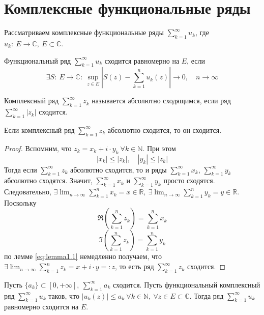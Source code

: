 \documentclass[11pt]{article}
\begin{document}
\section{Комплексные функциональные ряды} \leavevmode
Рассматриваем комплексные функциональные ряды $\displaystyle \sum_{k = 1}^{\infty} u_k$, где $u_k: \ E \to \mathbb{C}, \ E \subset \mathbb{C}$.

\begin{definition}
    Функциональный ряд $\displaystyle \sum_{k = 1}^{\infty} u_k$ сходится равномерно на $E$, если \[\exists S: \ E \to \mathbb{C}: \ \sup_{z \in E} \left|S(z) - 
    \sum_{k = 1}^{n} u_k(z)\right| \to 0, \quad n \to \infty\]
\end{definition}

\begin{definition}
    Комплексный ряд $\displaystyle \sum_{k = 1}^{\infty} z_k$ называется абсолютно сходящимся, если ряд $\displaystyle \sum_{k = 1}^{\infty} |z_k|$ сходится.
\end{definition}

\begin{lemma}
    Если комплексный ряд $\displaystyle \sum_{k = 1}^{\infty} z_k$ абсолютно сходится, то он сходится.
\end{lemma}

\begin{proof}
    Вспомним, что $z_k = x_k + i \cdot y_k \ \forall k \in \mathbb{N}$. При этом \[|x_k| \leq |z_k|, \quad |y_k| \leq |z_k|\] Тогда если $\displaystyle \sum_{k = 1}^{\infty} z_k$
    абсолютно сходится, то и ряды $\displaystyle \sum_{k = 1}^{\infty} x_k$, $\displaystyle \sum_{k = 1}^{\infty} y_k$ абсолютно сходятся. Значит, $\displaystyle \sum_{k = 1}^{\infty} x_k$
    и $\displaystyle \sum_{k = 1}^{\infty} y_k$ просто сходятся. Следовательно, $\displaystyle \exists \lim_{n \to \infty} \sum_{k = 1}^{n} x_k = x \in \mathbb{R}, \ 
    \exists \lim_{n \to \infty} \sum_{k = 1}^{n} y_k = y \in \mathbb{R}$. Поскольку \[\Re \left(\sum_{k = 1}^{n}z_k\right) = \sum_{k = 1}^{n} x_k\] 
    \[\Im \left(\sum_{k = 1}^{n}z_k\right) = \sum_{k = 1}^{n} y_k\] по лемме \ref{eq:lemma1.1} немедленно получаем, что $\displaystyle \exists \lim_{n \to \infty} 
    \sum_{k = 1}^{n} z_k = x + i \cdot y =: z$, то есть ряд $\displaystyle \sum_{k = 1}^{\infty} z_k$ сходится.
\end{proof}

\begin{theorem}
    Пусть $\{a_k\} \subset [0, +\infty], \ \displaystyle \sum_{k = 1}^{\infty} a_k$ сходится. Пусть функциональный комплексный ряд $\displaystyle \sum_{k = 1}^{\infty} u_k$ 
    таков, что $|u_k(z)| \leq a_k \ \forall k \in \mathbb{N}, \ \forall z \in E \subset \mathbb{C}$. Тогда ряд $\displaystyle \sum_{k = 1}^{\infty} u_k$  равномерно сходится на $E$.
\end{theorem}
\end{document}
